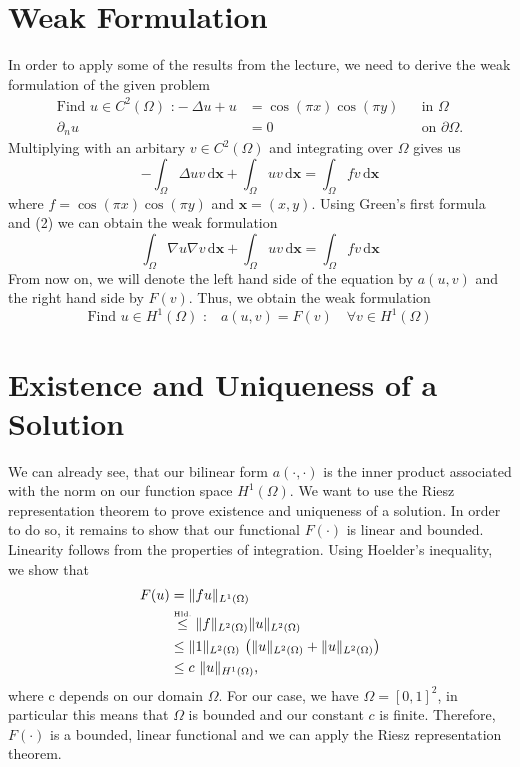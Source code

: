 \documentclass[a4paper,12pt]{article}
\begin{document}
\section{Weak Formulation}
In order to apply some of the results from the lecture, we need to derive the weak formulation of the given problem 
\begin{align}
\mbox{Find } u\in C^2(\Omega)\mbox{ :}-\Delta u+u &= \cos(\pi x)\cos(\pi y) &&\mbox{in } \Omega \\
\partial _n u &= 0 &&\mbox{on } \partial\Omega.
\end{align}
Multiplying with an arbitary $v\in C^2(\Omega)$ and integrating over $\Omega$ gives us
\[-\int _\Omega \Delta uv \,\mbox{d} \bm{x} + \int _\Omega uv \,\mbox{d} \bm{x} = \int _ \Omega fv\,\mbox{d} \bm{x}\]
where $f=\cos(\pi x)\cos(\pi y)$ and $\bm{x}=(x,y)$. Using Green's first formula and (2) we can obtain the weak formulation
\[\int _\Omega \nabla u\nabla v \,\mbox{d} \bm{x} + \int _\Omega uv \,\mbox{d} \bm{x} = \int _ \Omega fv\,\mbox{d} \bm{x}\]
From now on, we will denote the left hand side of the equation by $a(u,v)$ and the right hand side by $F(v)$. Thus, we obtain the weak formulation
\begin{equation}
\mbox{Find }u\in H^1(\Omega) \mbox{ :} \quad a(u,v)=F(v)\quad \forall v \in H^1(\Omega)
\end{equation}

\section{Existence and Uniqueness of a Solution}

We can already see, that our bilinear form $a(\cdotp ,\cdot)$ is the inner product associated with the norm on our function space $H^1(\Omega)$. We want to use the Riesz representation theorem to prove existence and uniqueness of a solution. In order to do so, it remains to show that our functional $F(\cdot)$ is linear and bounded. Linearity follows from the properties of integration. Using Hoelder's inequality, we show that
\begin{align*}
F(u)&=\|fu\|_{L^1(\Omega)}\\
	&\stackrel{\tiny\mbox{Hld.}}{\le} \|f\|_{L^2(\Omega)}\|u\|_{L^2(\Omega)}\\
	&\le \|1\|_{L^2(\Omega)}\ \big(\|u\|_{L^2(\Omega)}+\|u\|_{L^2(\Omega)}\big)\\
	&\le c\ \|u\|_{H^1(\Omega)}\mbox{,}
\end{align*}
where c depends on our domain $\Omega$. For our case, we have $\Omega=[0,1]^2$, in particular this means that $\Omega$ is bounded and our constant $c$ is finite. Therefore, $F(\cdot)$ is a bounded, linear functional and we can apply the Riesz representation theorem.
\end{document}
